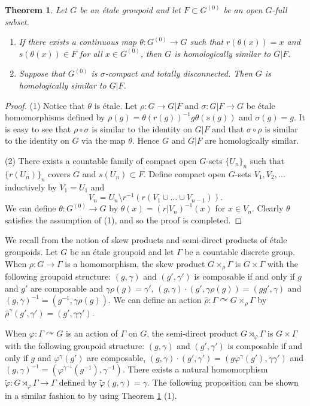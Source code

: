 \documentclass[11pt]{article}
\newtheorem{thm}{Theorem}[section]
\theoremstyle{definition}
\renewcommand{\phi}{\varphi}
\begin{document}
\begin{thm}\label{reduction}
Let $G$ be an \'etale groupoid and 
let $F\subset G^{(0)}$ be an open $G$-full subset. 
\begin{enumerate}
\item If there exists a continuous map $\theta:G^{(0)}\to G$ such that 
$r(\theta(x))=x$ and $s(\theta(x))\in F$ for all $x\in G^{(0)}$, then 
$G$ is homologically similar to $G|F$. 
\item Suppose that $G^{(0)}$ is $\sigma$-compact and totally disconnected. 
Then $G$ is homologically similar to $G|F$. 
\end{enumerate}
\end{thm}
\begin{proof}
(1) 
Notice that $\theta$ is \'etale. 
Let $\rho:G\to G|F$ and $\sigma:G|F\to G$ be \'etale homomorphisms 
defined by $\rho(g)=\theta(r(g))^{-1}g\theta(s(g))$ and $\sigma(g)=g$. 
It is easy to see that 
$\rho\circ\sigma$ is similar to the identity on $G|F$ and 
that $\sigma\circ\rho$ is similar to the identity on $G$ 
via the map $\theta$. 
Hence $G$ and $G|F$ are homologically similar. 

(2) There exists a countable family of compact open $G$-sets $\{U_n\}_n$ 
such that $\{r(U_n)\}_n$ covers $G$ and $s(U_n)\subset F$. 
Define compact open $G$-sets $V_1,V_2,\dots$ inductively by $V_1=U_1$ and 
\[
V_n=U_n\setminus r^{-1}(r(V_1\cup\dots\cup V_{n-1})). 
\]
We can define $\theta:G^{(0)}\to G$ 
by $\theta(x)=(r|V_n)^{-1}(x)$ for $x\in V_n$. 
Clearly $\theta$ satisfies the assumption of (1), 
and so the proof is completed. 
\end{proof}

We recall from \cite{R1} 
the notion of skew products and semi-direct products of \'etale groupoids. 
Let $G$ be an \'etale groupoid and 
let $\Gamma$ be a countable discrete group. 
When $\rho:G\to\Gamma$ is a homomorphism, 
the skew product $G\times_\rho\Gamma$ is 
$G\times\Gamma$ with the following groupoid structure: 
$(g,\gamma)$ and $(g',\gamma')$ is composable 
if and only if $g$ and $g'$ are composable and $\gamma\rho(g)=\gamma'$, 
$(g,\gamma)\cdot(g',\gamma\rho(g))=(gg',\gamma)$ and 
$(g,\gamma)^{-1}=(g^{-1},\gamma\rho(g))$. 
We can define an action $\hat\rho:\Gamma\curvearrowright G\times_\rho\Gamma$ 
by $\hat\rho^\gamma(g',\gamma')=(g',\gamma\gamma')$. 

When $\phi:\Gamma\curvearrowright G$ is an action of $\Gamma$ on $G$, 
the semi-direct product $G\rtimes_\phi\Gamma$ is 
$G\times\Gamma$ with the following groupoid structure: 
$(g,\gamma)$ and $(g',\gamma')$ is composable 
if and only if $g$ and $\phi^\gamma(g')$ are composable, 
$(g,\gamma)\cdot(g',\gamma')=(g\phi^\gamma(g'),\gamma\gamma')$ and 
$(g,\gamma)^{-1}=(\phi^{\gamma^{-1}}(g^{-1}),\gamma^{-1})$. 
There exists a natural homomorphism $\tilde\phi:G\rtimes_\phi\Gamma\to\Gamma$ 
defined by $\tilde\phi(g,\gamma)=\gamma$. 
The following proposition can be shown 
in a similar fashion to \cite[I.1.8]{R1} 
by using Theorem \ref{reduction} (1). 
\end{document}
